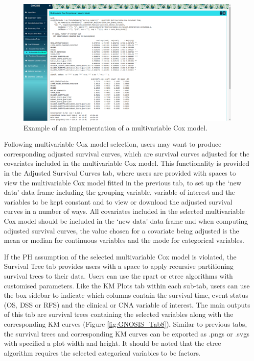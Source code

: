 \begin{figure}[!hp]
\center
\includegraphics[width=1\textwidth]{../figures/Chapter_3/GNOSIS_Fig7.png}
\caption[Example of an implementation of a multivariable Cox model.]{Example of an implementation of a multivariable Cox model.}
\label{fig:GNOSIS_MVC}
\end{figure}

Following multivariable Cox model selection, users may want to produce corresponding adjusted survival curves, which are survival curves adjusted for the covariates included in the multivariable Cox model. This functionality is provided in the Adjusted Survival Curves tab, where users are provided with spaces to view the multivariable Cox model fitted in the previous tab, to set up the ‘new data’ data frame including the grouping variable, variable of interest and the variables to be kept constant and to view or download the adjusted survival curves in a number of ways. All covariates included in the selected multivariable Cox model should be included in the ‘new data’ data frame and when computing adjusted survival curves, the value chosen for a covariate being adjusted is the mean or median for continuous variables and the mode for categorical variables. 

If the PH assumption of the selected multivariable Cox model is violated, the Survival Tree tab provides users with a space to apply recursive partitioning survival trees to their data. Users can use the rpart \citep{rpart} or ctree \citep{ctree1, hothorn_hornik_zeileis_2006} algorithms with customised parameters. Like the KM Plots tab within each sub-tab, users can use the box sidebar to indicate which columns contain the survival time, event status (OS, DSS or RFS) and the clinical or CNA variable of interest. The main outputs of this tab are survival trees containing the selected variables along with the corresponding KM curves (Figure \ref{fig:GNOSIS_Tab8}). Similar to previous tabs, the survival trees and corresponding KM curves can be exported as .pngs or .svgs with specified a plot width and height. It should be noted that the ctree algorithm requires the selected categorical variables to be factors. 

